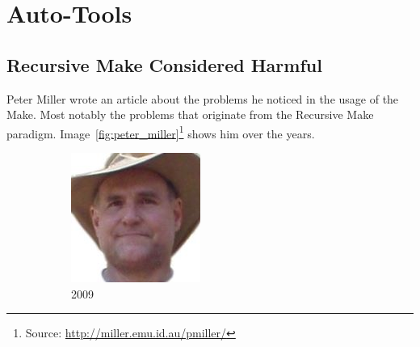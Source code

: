 
\section{Auto-Tools}


\subsection{Recursive Make Considered Harmful}
Peter Miller wrote an article about the problems he noticed in the usage of the Make\cite{miller1998recursive}. Most notably the problems that originate from the Recursive Make paradigm.
Image~\ref{fig:peter_miller}\footnote{Source: \url{http://miller.emu.id.au/pmiller/}} shows him over the years.
\begin{figure} \centering
\captionsetup[subfigure]{labelformat=empty}
\begin{subfigure}{0.19\textwidth}
\includegraphics[width=\textwidth]{images/peter_miller_2009.jpg}
\caption{2009}
\end{subfigure}
\begin{subfigure}{0.19\textwidth}

\end{subfigure}
\end{figure}
